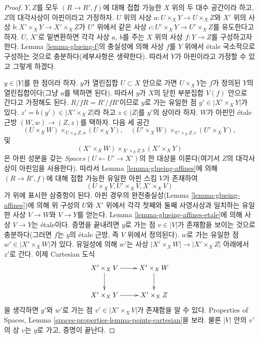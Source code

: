\begin{proof}
$Y, Z$를 모두 $(R \to R', f)$에 대해 접합 가능한 $X$ 위의 두 대수
공간이라 하고, $Z$의 대각사상이 아핀이라고 가정하자. $U$ 위의 사상
$a : U \times_X Y \to U \times_X Z$와 $X'$ 위의 사상
$b : X' \times_X Y \to X' \times_X Z$가 $U'$ 위에서 같은 사상
$c : U' \times_X Y \to U' \times_X Z$를 유도한다고 하자.
$U$, $X'$로 밑변환하면 각각 사상 $a$, $b$를 주는 $X$ 위의 사상
$f : Y \to Z$를 구성하고자 한다. Lemma
\ref{lemma-glueing-f}의 충실성에 의해 사상 $f$를 $Y$ 위에서 \'etale
국소적으로 구성하는 것으로 충분하다(세부사항은 생략한다).
따라서 $Y$가 아핀이라고 가정할 수 있고 그렇게 하겠다.

\medskip\noindent
$y \in |Y|$를 한 점이라 하자. $y$가 열린집합 $U \subset X$ 안으로
가면 $U \times_X Y$는 $f$가 정의된 $Y$의 열린집합이다(그냥 $a$를
택하면 된다). 따라서 $y$가 $X$의 닫힌 부분집합 $V(f)$ 안으로 간다고
가정해도 된다. $R/fR = R'/fR'$이므로 $y$로 가는 유일한 점
$y' \in |X' \times_X Y|$가 있다. $z' = b(y') \in |X' \times_X Z|$라
하고 $z \in |Z|$를 $y'$의 상이라 하자. $W$가 아핀인 \'etale 근방
$(W, w) \to (Z, z)$를 택하자. 다음 세 공간
$$
(U \times_X W) \times_{U \times_X Z, a} (U \times_X Y),\quad
(U' \times_X W) \times_{U' \times_X Z, c} (U' \times_X Y),
$$
및
$$
(X' \times_X W) \times_{X' \times_X Z, b} (X' \times_X Y)
$$
은 아핀 성분을 갖는 $\textit{Spaces}(U \leftarrow U' \to X')$의
한 대상을 이룬다(여기서 $Z$의 대각사상이 아핀임을 사용한다).
따라서 Lemma \ref{lemma-glueing-affines}에 의해
$(R \to R', f)$에 대해 접합 가능한 유일한 아핀 스킴 $V$가 존재하여
$$
(U \times_X V, U' \times_X V, X' \times_X V)
$$
가 위에 표시한 삼중항이 된다. 아핀 경우의 완전충실성(Lemma
\ref{lemma-glueing-affines})에 의해 위 구성의 $U$와 $X'$ 위에서 각각
첫째와 둘째 사영사상과 일치하는
유일한 사상 $V \to W$와 $V \to Y$를 얻는다. Lemma
\ref{lemma-glueing-affines-etale}에 의해 사상 $V \to Y$는 \'etale이다.
증명을 끝내려면 $y$로 가는 점 $v \in |V|$가 존재함을 보이는 것으로
충분하다(그러면 $f$는 $y$의 \'etale 근방, 즉 $V$ 위에서 정의된다).
$w$로 가는 유일한 점 $w' \in |X' \times_X W|$가 있다. 유일성에 의해
$w'$는 사상 $|X' \times_X W| \to |X' \times_X Z|$ 아래에서 $z'$로 간다.
이제 Cartesian 도식
$$
\xymatrix{
X' \times_X V \ar[r] \ar[d] & X' \times_X W \ar[d] \\
X' \times_X Y \ar[r] & X' \times_X Z
}
$$
을 생각하면 $y'$와 $w'$로 가는 점 $v' \in |X' \times_X V|$가
존재함을 알 수 있다. Properties of Spaces, Lemma
\ref{spaces-properties-lemma-points-cartesian}을 보라. 물론 $|V|$ 안의
$v'$의 상 $v$는 $y$로 가고, 증명이 끝난다.
\end{proof}

